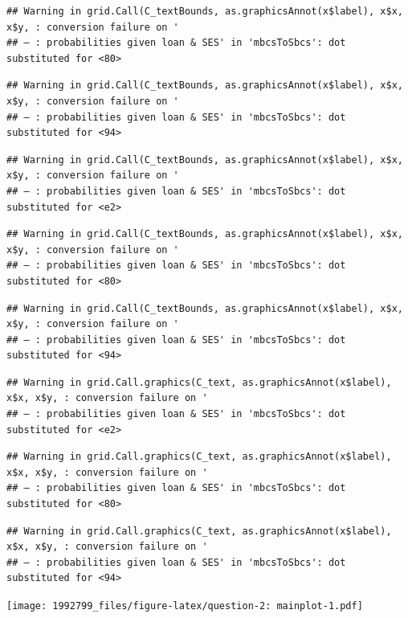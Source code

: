 \documentclass[]{article}
\begin{document}
\begin{verbatim}
## Warning in grid.Call(C_textBounds, as.graphicsAnnot(x$label), x$x, x$y, : conversion failure on '
## — : probabilities given loan & SES' in 'mbcsToSbcs': dot substituted for <80>
\end{verbatim}

\begin{verbatim}
## Warning in grid.Call(C_textBounds, as.graphicsAnnot(x$label), x$x, x$y, : conversion failure on '
## — : probabilities given loan & SES' in 'mbcsToSbcs': dot substituted for <94>
\end{verbatim}

\begin{verbatim}
## Warning in grid.Call(C_textBounds, as.graphicsAnnot(x$label), x$x, x$y, : conversion failure on '
## — : probabilities given loan & SES' in 'mbcsToSbcs': dot substituted for <e2>
\end{verbatim}

\begin{verbatim}
## Warning in grid.Call(C_textBounds, as.graphicsAnnot(x$label), x$x, x$y, : conversion failure on '
## — : probabilities given loan & SES' in 'mbcsToSbcs': dot substituted for <80>
\end{verbatim}

\begin{verbatim}
## Warning in grid.Call(C_textBounds, as.graphicsAnnot(x$label), x$x, x$y, : conversion failure on '
## — : probabilities given loan & SES' in 'mbcsToSbcs': dot substituted for <94>
\end{verbatim}

\begin{verbatim}
## Warning in grid.Call.graphics(C_text, as.graphicsAnnot(x$label), x$x, x$y, : conversion failure on '
## — : probabilities given loan & SES' in 'mbcsToSbcs': dot substituted for <e2>
\end{verbatim}

\begin{verbatim}
## Warning in grid.Call.graphics(C_text, as.graphicsAnnot(x$label), x$x, x$y, : conversion failure on '
## — : probabilities given loan & SES' in 'mbcsToSbcs': dot substituted for <80>
\end{verbatim}

\begin{verbatim}
## Warning in grid.Call.graphics(C_text, as.graphicsAnnot(x$label), x$x, x$y, : conversion failure on '
## — : probabilities given loan & SES' in 'mbcsToSbcs': dot substituted for <94>
\end{verbatim}

\texttt{[image: 1992799\_files/figure-latex/question-2: mainplot-1.pdf]}
\end{document}
